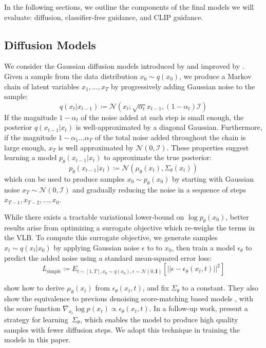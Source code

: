 \documentclass{article}
\begin{document}
In the following sections, we outline the components of the final models we will evaluate: diffusion, classifier-free guidance, and CLIP guidance.

\subsection{Diffusion Models}
\label{sec:diffusionbackground}

We consider the Gaussian diffusion models introduced by \citet{dickstein} and improved by \citet{scorematching,ddpm}. Given a sample from the data distribution $x_0 \sim q(x_0)$, we produce a Markov chain of latent variables $x_1, ..., x_T$ by progressively adding Gaussian noise to the sample:
%
$$q(x_t | x_{t-1}) \coloneqq \mathcal{N}(x_t; \sqrt{\alpha_t} x_{t-1}, (1-\alpha_t)\mathcal{I})$$
If the magnitude $1-\alpha_t$ of the noise added at each step is small enough, the posterior $q(x_{t-1} | x_{t})$ is well-approximated by a diagonal Gaussian. Furthermore, if the magnitude $1 -\alpha_1 ... \alpha_T$ of the total noise added throughout the chain is large enough, $x_T$ is well approximated by $\mathcal{N}(0, \mathcal{I})$. These properties suggest learning a model $p_\theta(x_{t-1} | x_t)$ to approximate the true posterior:
$$p_{\theta}(x_{t-1}|x_t) \coloneqq \mathcal{N}(\mu_{\theta}(x_t), \Sigma_{\theta}(x_t))$$
which can be used to produce samples $x_0 \sim p_\theta(x_0)$ by starting with Gaussian noise $x_T \sim \mathcal{N}(0, \mathcal{I})$ and gradually reducing the noise in a sequence of steps $x_{T-1}, x_{T-2}, ..., x_0$.

While there exists a tractable variational lower-bound on $\log p_\theta(x_0)$, better results arise from optimizing a surrogate objective which re-weighs the terms in the VLB. To compute this surrogate objective, we generate samples $x_t \sim q(x_t | x_0)$ by applying Gaussian noise $\epsilon$ to to $x_0$, then train a model $\epsilon_{\theta}$ to predict the added noise using a standard mean-squared error loss:
$$L_{\text{simple}} \coloneqq E_{t \sim [1,T],x_0 \sim q(x_0), \epsilon \sim \mathcal{N}(0, \mathbf{I})}[||\epsilon - \epsilon_{\theta}(x_t, t)||^2] \label{eq:lsimple}$$

\citet{ddpm} show how to derive $\mu_{\theta}(x_t)$ from $\epsilon_{\theta}(x_t, t)$, and fix $\Sigma_{\theta}$ to a constant. They also show the equivalence to previous denoising score-matching based models \cite{scorematching,improvedscore}, with the score function $\nabla_{x_t} \log p(x_t) \propto \epsilon_{\theta}(x_t, t)$. In a follow-up work, \citet{improved} present a strategy for learning~$\Sigma_{\theta}$, which enables the model to produce high quality samples with fewer diffusion steps. We adopt this technique in training the models in this paper.
\end{document}
